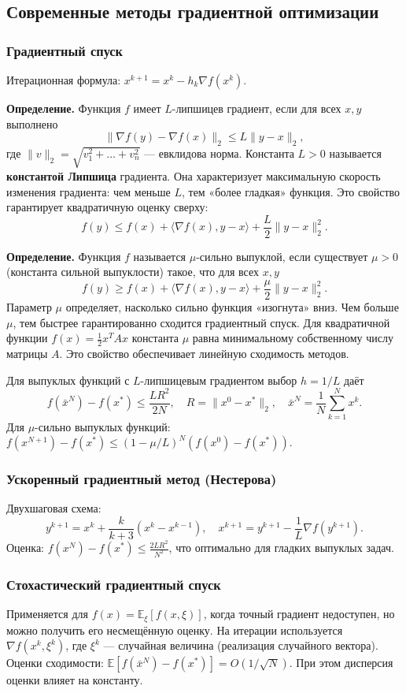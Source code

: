 \documentclass{article}
\theoremstyle{plain}
\begin{document}
\subsection{Современные методы градиентной оптимизации}
\subsubsection{Градиентный спуск}
Итерационная формула: $x^{k+1} = x^k - h_k \nabla f(x^k)$.

\textbf{Определение.} Функция $f$ имеет $L$-липшицев градиент, если для всех $x,y$ выполнено
\[
\|\nabla f(y) - \nabla f(x)\|_2 \le L \|y - x\|_2,
\]
где $\|v\|_2 = \sqrt{v_1^2+\dots+v_n^2}$ — евклидова норма. Константа $L>0$ называется \textbf{константой Липшица} градиента. Она характеризует максимальную скорость изменения градиента: чем меньше $L$, тем «более гладкая» функция. Это свойство гарантирует квадратичную оценку сверху:
\[
f(y) \le f(x) + \langle \nabla f(x), y-x \rangle + \frac{L}{2}\|y-x\|_2^2.
\]

\textbf{Определение.} Функция $f$ называется $\mu$-сильно выпуклой, если существует $\mu>0$ (константа сильной выпуклости) такое, что для всех $x,y$
\[
f(y) \ge f(x) + \langle \nabla f(x), y-x \rangle + \frac{\mu}{2}\|y-x\|_2^2.
\]
Параметр $\mu$ определяет, насколько сильно функция «изогнута» вниз. Чем больше $\mu$, тем быстрее гарантированно сходится градиентный спуск. Для квадратичной функции $f(x)=\frac12 x^T A x$ константа $\mu$ равна минимальному собственному числу матрицы $A$. Это свойство обеспечивает линейную сходимость методов.

Для выпуклых функций с $L$-липшицевым градиентом выбор $h = 1/L$ даёт
\[
f(\bar{x}^N) - f(x^*) \le \frac{L R^2}{2N},\quad R = \|x^0 - x^*\|_2,\quad \bar{x}^N = \frac{1}{N}\sum_{k=1}^N x^k.
\]
Для $\mu$-сильно выпуклых функций: $f(x^{N+1})-f(x^*) \le (1-\mu/L)^N (f(x^0)-f(x^*))$.

\subsubsection{Ускоренный градиентный метод (Нестерова)}
Двухшаговая схема:
\[
y^{k+1} = x^k + \frac{k}{k+3}(x^k - x^{k-1}),\quad x^{k+1} = y^{k+1} - \frac{1}{L}\nabla f(y^{k+1}).
\]
Оценка: $f(x^N) - f(x^*) \le \frac{2LR^2}{N^2}$, что оптимально для гладких выпуклых задач.

\subsubsection{Стохастический градиентный спуск}
Применяется для $f(x) = \mathbb{E}_{\xi}[f(x,\xi)]$, когда точный градиент недоступен, но можно получить его несмещённую оценку. На итерации используется $\nabla f(x^k, \xi^k)$, где $\xi^k$ — случайная величина (реализация случайного вектора). Оценки сходимости: $\mathbb{E}[f(\bar{x}^N)-f(x^*)] = O(1/\sqrt{N})$. При этом дисперсия оценки влияет на константу.
\end{document}
